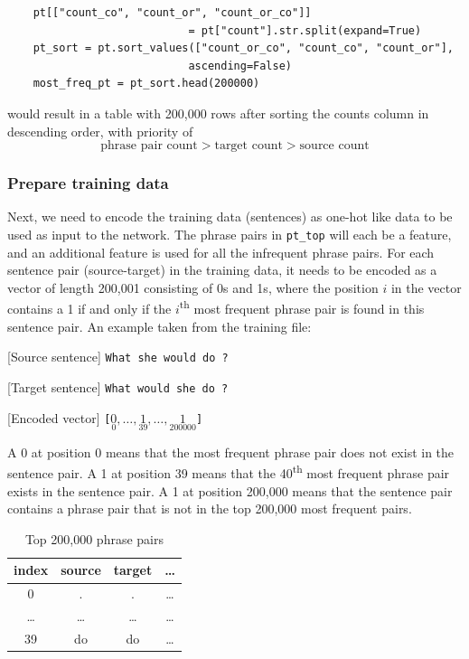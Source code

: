 \documentclass[12pt,a4paper,twoside,openright]{report}
\begin{document}
\begin{verbatim}
    pt[["count_co", "count_or", "count_or_co"]] 
                            = pt["count"].str.split(expand=True)
    pt_sort = pt.sort_values(["count_or_co", "count_co", "count_or"], 
                            ascending=False)
    most_freq_pt = pt_sort.head(200000)
\end{verbatim}

would result in a table with 200,000 rows after sorting the counts column in descending order, with priority of
\[\textrm{phrase pair count} > \textrm{target count} > \textrm{source count}\]

\subsubsection{Prepare training data}
Next, we need to encode the training data (sentences) as one-hot like data to be used as input to the network. The phrase pairs in \texttt{pt\_top} will each be a feature, and an additional feature is used for all the infrequent phrase pairs. For each sentence pair (source-target) in the training data, it needs to be encoded as a vector of length 200,001 consisting of 0s and 1s, where the position $i$ in the vector contains a 1 if and only if the $i$\textsuperscript{th} most frequent phrase pair is found in this sentence pair. An example taken from the training file:

[Source sentence]
\texttt{What she would do ?}

[Target sentence]
\texttt{What would she do ?}

[Encoded vector]
\texttt{[$\underset{0}{0}, \ldots, \underset{39}{1}, \ldots, \underset{200000}{1}$]}

A 0 at position 0 means that the most frequent phrase pair does not exist in the sentence pair. A 1 at position 39 means that the 40\textsuperscript{th} most frequent phrase pair exists in the sentence pair. A 1 at position 200,000 means that the sentence pair contains a phrase pair that is not in the top 200,000 most frequent pairs.

\begin{table}[ht]
\centering
\begin{tabular}{ |c|c|c|c| } 
 \hline
 index & source & target & \ldots \\ [0.5ex] 
 \hline
 0 & . & . & \ldots \\ 
 \ldots & \ldots & \ldots & \ldots \\ 
 39 & do & do & \ldots \\ 
 \hline
\end{tabular}
\caption{Top 200,000 phrase pairs}
\label{table:pt_top_exmaple}
\end{table}
\end{document}
